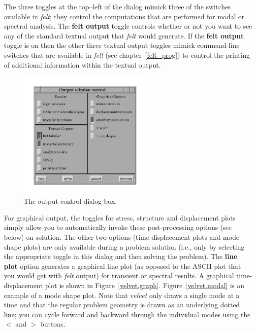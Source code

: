 The three toggles at the top--left of the dialog mimick three of the
switches available in {\em felt}; they control the computations that are 
performed for modal or spectral analysis.  The {\bf felt output} toggle 
controls whether or not you want to see any of the standard textual output
that {\em felt} would generate.   If the {\bf felt output} toggle is on then 
the other three textual output toggles mimick command-line 
switches that are available in {\em felt} (see chapter~\ref{felt_prog}) to
control the printing of additional information within the textual output.  

\begin{figure}
\begin{center}
 \includegraphics[width=2.59in]{figures/velvet_output}
\end{center}
\caption{The output control dialog box.}
\label{velvet.output}
\end{figure}

For graphical output, the toggles for
stress, structure and displacement plots simply allow you to automatically
invoke these post-processing options (see below) on solution.  The other two
options (time-displacement plots and mode shape plots) are only available
during a problem solution (i.e., only by selecting the appropriate toggle
in this dialog and then solving the problem).  The
{\bf line plot} option generates a graphical line plot (as opposed
to the ASCII plot that you would get with {\em felt} output) for transient
or spectral results.  A graphical time-displacement plot is 
shown in Figure~\ref{velvet.graph}.  Figure~\ref{velvet.modal} is an example of
a mode shape plot.  Note that {\em velvet} only draws a single mode 
at a time and that the regular problem geometry is drawn as an underlying 
dotted line; you can cycle forward and backward through the individual modes
using the $<$ and $>$ buttons.

